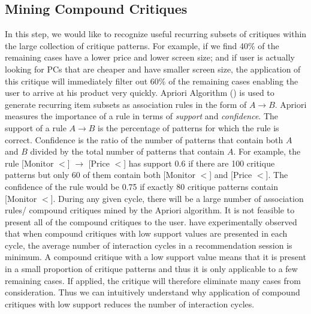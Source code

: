 \subsection{Mining Compound Critiques}
In this step, we would like to recognize useful recurring subsets of critiques within the large collection of critique patterns.
For example, if we find 40\% of the remaining cases have a lower price and lower screen size; and if user is actually looking for PCs that are cheaper and have smaller screen size, the application of this critique will immediately filter out 60\% of the remaining cases enabling the user to arrive at his product very quickly.
Apriori Algorithm (\cite{aprioriAlgo}) is used to generate recurring item subsets as association rules in the form of $A \rightarrow B$.
Apriori measures the importance of a rule in terms of \textit{support} and \textit{confidence}.
The support of a rule $A \rightarrow B$ is the percentage of patterns for which the rule is correct.
Confidence is the ratio of the number of patterns that contain both $A$ and $B$ divided by the total number of patterns that contain $A$.
For example, the rule [Monitor $<$] $\rightarrow$ [Price $<$] has support 0.6 if there are 100 critique patterns but only 60 of them contain both [Monitor $<$] and [Price $<$]. 
The confidence of the rule would be 0.75 if exactly 80 critique patterns contain [Monitor $<$].
During any given cycle, there will be a large number of association rules/ compound critiques mined by the Apriori algorithm.
It is not feasible to present all of the compound critiques to the user.
\cite{mccarthy2004dynamic} have experimentally observed that when compound critiques with low support values are presented in each cycle, the average number of interaction cycles in a recommendation session is minimum.
A compound critique with a low support value means that it is present in a small proportion of critique patterns and thus it is only applicable to a few remaining cases. 
If applied, the critique will therefore eliminate many cases from consideration.
Thus we can intuitively understand why application of compound critiques with low support reduces the number of interaction cycles.



